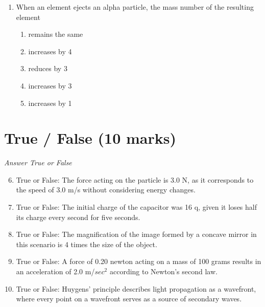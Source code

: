 \documentclass[12pt]{article}
\begin{document}
\begin{enumerate}[label=\arabic*.]
\begin{enumerate}[label=(\alph*)]
    \item 6.7 \ensuremath{\times} 10^-17 kg
    \item 2.2 \ensuremath{\times} 10^-22 kg
    \item 3.0 \ensuremath{\times} 10^-32 kg
    \item 5.5 \ensuremath{\times} 10^-31 kg
    \item 1.76 \ensuremath{\times} $10^11$ kg
\end{enumerate}
\item When an element ejects an alpha particle, the mass number of the resulting element
\begin{enumerate}[label=(\alph*)]
    \item remains the same
    \item increases by 4
    \item reduces by 3
    \item increases by 3
    \item increases by 1
\end{enumerate}
\end{enumerate}

\section*{True / False (10 marks)}
\textit{Answer True or False}
\begin{enumerate}[label=\arabic*.]
\setcounter{enumi}{5}
\item True or False: The force acting on the particle is 3.0 N, as it corresponds to the speed of 3.0 m/s without considering energy changes.
\item True or False: The initial charge of the capacitor was 16 q, given it loses half its charge every second for five seconds.
\item True or False: The magnification of the image formed by a concave mirror in this scenario is 4 times the size of the object.
\item True or False: A force of 0.20 newton acting on a mass of 100 grams results in an acceleration of 2.0 m/$sec^2$ according to Newton's second law.
\item True or False: Huygens' principle describes light propagation as a wavefront, where every point on a wavefront serves as a source of secondary waves.
\end{enumerate}
\end{document}
